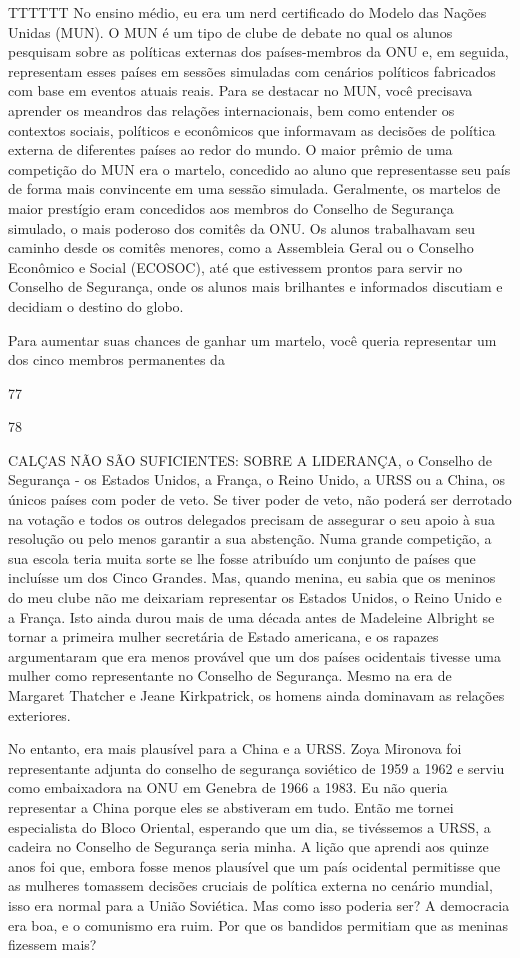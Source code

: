 TTTTTT No ensino médio, eu era um nerd certificado do Modelo das Nações Unidas (MUN). O MUN é um tipo de clube de debate no qual os alunos pesquisam sobre as políticas externas dos países-membros da ONU e, em seguida, representam esses países em sessões simuladas com cenários políticos fabricados com base em eventos atuais reais. Para se destacar no MUN, você precisava aprender os meandros das relações internacionais, bem como entender os contextos sociais, políticos e econômicos que informavam as decisões de política externa de diferentes países ao redor do mundo. O maior prêmio de uma competição do MUN era o martelo, concedido ao aluno que representasse seu país de forma mais convincente em uma sessão simulada. Geralmente, os martelos de maior prestígio eram concedidos aos membros do Conselho de Segurança simulado, o mais poderoso dos comitês da ONU. Os alunos trabalhavam seu caminho desde os comitês menores, como a Assembleia Geral ou o Conselho Econômico e Social (ECOSOC), até que estivessem prontos para servir no Conselho de Segurança, onde os alunos mais brilhantes e informados discutiam e decidiam o destino do globo.
 \par 
Para aumentar suas chances de ganhar um martelo, você queria representar um dos cinco membros permanentes da
 \par 
77
 \par 
78
 \par 
CALÇAS NÃO SÃO SUFICIENTES: SOBRE A LIDERANÇA, o Conselho de Segurança - os Estados Unidos, a França, o Reino Unido, a URSS ou a China, os únicos países com poder de veto. Se tiver poder de veto, não poderá ser derrotado na votação e todos os outros delegados precisam de assegurar o seu apoio à sua resolução ou pelo menos garantir a sua abstenção. Numa grande competição, a sua escola teria muita sorte se lhe fosse atribuído um conjunto de países que incluísse um dos Cinco Grandes. Mas, quando menina, eu sabia que os meninos do meu clube não me deixariam representar os Estados Unidos, o Reino Unido e a França. Isto ainda durou mais de uma década antes de Madeleine Albright se tornar a primeira mulher secretária de Estado americana, e os rapazes argumentaram que era menos provável que um dos países ocidentais tivesse uma mulher como representante no Conselho de Segurança. Mesmo na era de Margaret Thatcher e Jeane Kirkpatrick, os homens ainda dominavam as relações exteriores.
 \par 
No entanto, era mais plausível para a China e a URSS. Zoya Mironova foi representante adjunta do conselho de segurança soviético de 1959 a 1962 e serviu como embaixadora na ONU em Genebra de 1966 a 1983. Eu não queria representar a China porque eles se abstiveram em tudo. Então me tornei especialista do Bloco Oriental, esperando que um dia, se tivéssemos a URSS, a cadeira no Conselho de Segurança seria minha. A lição que aprendi aos quinze anos foi que, embora fosse menos plausível que um país ocidental permitisse que as mulheres tomassem decisões cruciais de política externa no cenário mundial, isso era normal para a União Soviética. Mas como isso poderia ser? A democracia era boa, e o comunismo era ruim. Por que os bandidos permitiam que as meninas fizessem mais?
